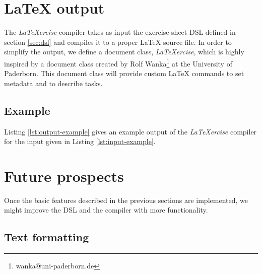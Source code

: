\documentclass[12pt,letterpaper, onecolumn]{article}
\begin{document}
\begin{center}
\begin{minipage}{0.8\textwidth}

\end{minipage}
\end{center}

\section{\LaTeX{} output}\label{sec:output}

The \emph{LaTeXercise} compiler takes as input the exercise sheet DSL defined in section \ref{sec:dsl} and compiles it to a proper \LaTeX{} source file. In order to simplify the output, we define a document class, \emph{LaTeXercise}, which is highly inspired by a document class created by Rolf Wanka\footnote{wanka@uni-paderborn.de} at the University of Paderborn. This document class will provide custom \LaTeX{} commands to set metadata and to describe tasks.

\subsection{Example}

Listing \ref{lst:output-example} gives an example output of the \emph{LaTeXercise} compiler for the input given in Listing \ref{lst:input-example}.

\begin{center}
\begin{minipage}{0.8\textwidth}

\end{minipage}
\end{center}


\section{Future prospects}\label{sec:future}

Once the basic features described in the previous sections are implemented, we might improve the DSL and the compiler with more functionality.\\

\subsection{Text formatting}
\end{document}
